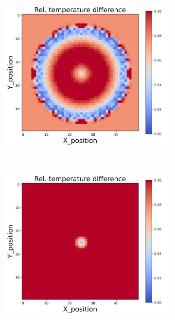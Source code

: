 {\begin{figure}[h]
\begin{minipage}{\textwidth}
\begin{subfigure}{0.27\textwidth}
        \end{subfigure}
        \begin{subfigure}{0.27\textwidth}
            \centering
            \includegraphics[width=\textwidth]{figures/raw_data/31/mix/T_bias.jpg}
        \end{subfigure}
    \end{minipage}\\
    \begin{minipage}{\textwidth}
        \centering
        \begin{subfigure}{0.27\textwidth}
            \centering
            \includegraphics[width=\textwidth]{figures/raw_data/32/mix/T_bias.jpg}

\end{subfigure}
\end{minipage}
\end{figure}}
